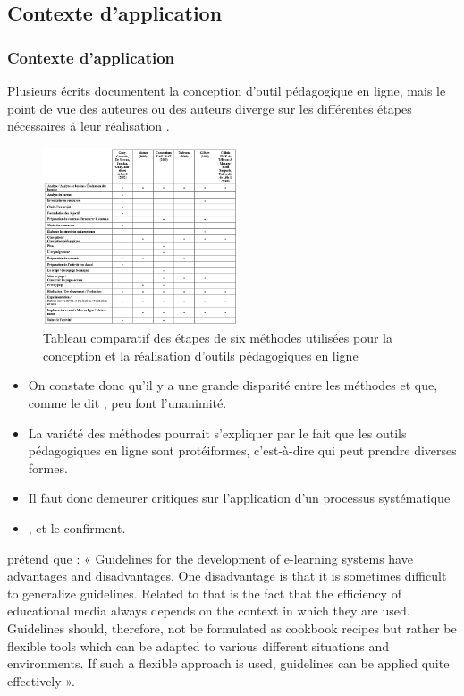   \subsection{Contexte d'application} 
		\begin{frame}[allowframebreaks]
			\frametitle{Contexte d'application}
			Plusieurs écrits documentent la conception d’outil pédagogique en ligne, mais le point de vue des auteures ou des auteurs diverge sur les différentes étapes nécessaires à leur réalisation \citep[p.18]{bonneau2013a}.
                   \begin{figure}
                     \centering
                     \includegraphics[width = 0.52\textwidth]{tableau6methodes.png}
                     \caption{\tiny{Tableau comparatif des étapes de six méthodes utilisées pour la conception et la réalisation d’outils pédagogiques en ligne \citep[p.20]{bonneau2013a}}}
                   \end{figure}
                   \begin{itemize}                   
                   \item On constate donc qu’il y a une grande disparité entre les méthodes et que, comme le dit \citet{bonneau2013a} , peu font l’unanimité. 
                   \item La variété des méthodes pourrait s’expliquer par le fait que les outils pédagogiques en ligne sont protéiformes, c’est-à-dire qui peut prendre diverses formes.
                   \item Il faut donc demeurer critiques sur l’application d’un processus systématique
                   \item \citet[p.10]{retalis1997a}, \citet[p.46]{smith2006a} et \citet[p.3]{pohl2004a} le confirment.
                   \end{itemize}
\par \citet[p.3]{pohl2004a} prétend que : « Guidelines for the development of e-learning systems have advantages and disadvantages. One disadvantage is that it is sometimes difficult to generalize guidelines. Related to that is the fact that the efficiency of educational media always depends on the context in which they are used. Guidelines should, therefore, not be formulated as cookbook recipes but rather be flexible tools which can be adapted to various different situations and environments. If such a flexible approach is used, guidelines can be applied quite effectively ».

\end{frame}
